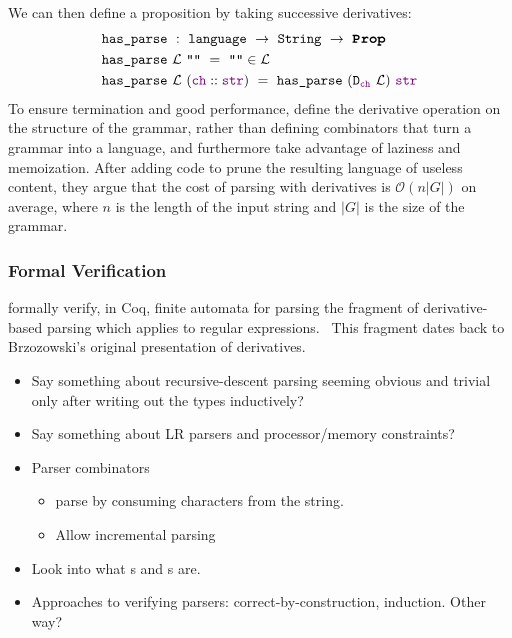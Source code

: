       We can then define a  proposition by taking successive derivatives:
\begin{align*}
&\fname{has\_parse}~:~\coqtype{language}~\to~\coqtype{String}~\to~\Prop \\
&\fname{has\_parse}~\mathcal{L}~\str{}~=~\str{}\in\mathcal{L} \\
&\fname{has\_parse}~\mathcal{L}~(\cons{\farg{ch}}{\farg{str}})~=~\fname{has\_parse}~(\fname{D\ensuremath{_{\farg{ch}}}}~\mathcal L)~\farg{str}
\end{align*}
      To ensure termination and good performance, \citeauthor*{Derivs} define the derivative operation on the structure of the grammar, rather than defining combinators that turn a grammar into a language, and furthermore take advantage of laziness and memoization.  After adding code to prune the resulting language of useless content, they argue that the cost of parsing with derivatives is $\mathcal O(n|G|)$ on average, where $n$ is the length of the input string and $|G|$ is the size of the grammar.
      
    \subsubsection{Formal Verification}
       formally verify, in Coq, finite automata for parsing the fragment of derivative-based parsing which applies to regular expressions.~\cite{DerivsCoq}  This fragment dates back to Brzozowski's original presentation of derivatives.~\cite{BrzozowskiDerivs}
      
  
  \begin{itemize}
    \item Say something about recursive-descent parsing seeming obvious and trivial only after writing out the types inductively?
    \item Say something about LR parsers and processor/memory constraints?
    \item Parser combinators
      \begin{itemize}
        \item parse by consuming characters from the string.
        \item Allow incremental parsing
      \end{itemize}
    \item Look into what \cite{PEG}s and \cite{GLL}s are.
    \item Approaches to verifying parsers: correct-by-construction, induction.  Other way?  
  \end{itemize}

